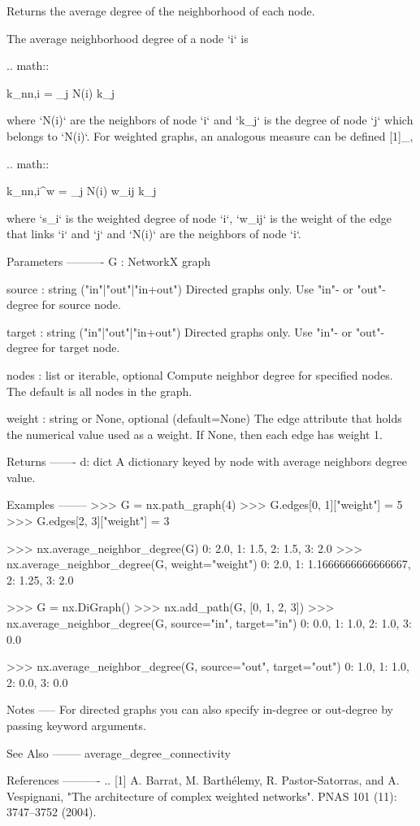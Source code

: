 \begin{DoxyVerb}Returns the average degree of the neighborhood of each node.

The average neighborhood degree of a node `i` is

.. math::

    k_{nn,i} =  \sum_{j \in N(i)} k_j

where `N(i)` are the neighbors of node `i` and `k_j` is
the degree of node `j` which belongs to `N(i)`. For weighted
graphs, an analogous measure can be defined [1]_,

.. math::

    k_{nn,i}^{w} =  \sum_{j \in N(i)} w_{ij} k_j

where `s_i` is the weighted degree of node `i`, `w_{ij}`
is the weight of the edge that links `i` and `j` and
`N(i)` are the neighbors of node `i`.


Parameters
----------
G : NetworkX graph

source : string ("in"|"out"|"in+out")
   Directed graphs only.
   Use "in"- or "out"-degree for source node.

target : string ("in"|"out"|"in+out")
   Directed graphs only.
   Use "in"- or "out"-degree for target node.

nodes : list or iterable, optional
    Compute neighbor degree for specified nodes.  The default is
    all nodes in the graph.

weight : string or None, optional (default=None)
   The edge attribute that holds the numerical value used as a weight.
   If None, then each edge has weight 1.

Returns
-------
d: dict
   A dictionary keyed by node with average neighbors degree value.

Examples
--------
>>> G = nx.path_graph(4)
>>> G.edges[0, 1]["weight"] = 5
>>> G.edges[2, 3]["weight"] = 3

>>> nx.average_neighbor_degree(G)
{0: 2.0, 1: 1.5, 2: 1.5, 3: 2.0}
>>> nx.average_neighbor_degree(G, weight="weight")
{0: 2.0, 1: 1.1666666666666667, 2: 1.25, 3: 2.0}

>>> G = nx.DiGraph()
>>> nx.add_path(G, [0, 1, 2, 3])
>>> nx.average_neighbor_degree(G, source="in", target="in")
{0: 0.0, 1: 1.0, 2: 1.0, 3: 0.0}

>>> nx.average_neighbor_degree(G, source="out", target="out")
{0: 1.0, 1: 1.0, 2: 0.0, 3: 0.0}

Notes
-----
For directed graphs you can also specify in-degree or out-degree
by passing keyword arguments.

See Also
--------
average_degree_connectivity

References
----------
.. [1] A. Barrat, M. Barthélemy, R. Pastor-Satorras, and A. Vespignani,
   "The architecture of complex weighted networks".
   PNAS 101 (11): 3747–3752 (2004).
\end{DoxyVerb}
 
